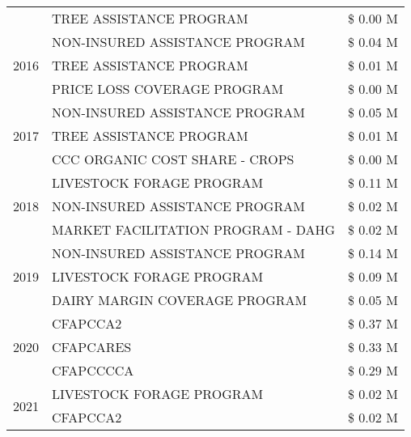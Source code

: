 \begin{tabular}{llr}
 & TREE ASSISTANCE PROGRAM & \$ 0.00 M \\
\cline{1-3}
\multirow[t]{3}{*}{2016} & NON-INSURED ASSISTANCE PROGRAM                & \$ 0.04 M \\
 & TREE ASSISTANCE PROGRAM                       & \$ 0.01 M \\
 & PRICE LOSS COVERAGE PROGRAM                   & \$ 0.00 M \\
\cline{1-3}
\multirow[t]{3}{*}{2017} & NON-INSURED ASSISTANCE PROGRAM & \$ 0.05 M \\
 & TREE ASSISTANCE PROGRAM & \$ 0.01 M \\
 & CCC ORGANIC COST SHARE - CROPS & \$ 0.00 M \\
\cline{1-3}
\multirow[t]{3}{*}{2018} & LIVESTOCK FORAGE PROGRAM & \$ 0.11 M \\
 & NON-INSURED ASSISTANCE PROGRAM & \$ 0.02 M \\
 & MARKET FACILITATION PROGRAM - DAHG & \$ 0.02 M \\
\cline{1-3}
\multirow[t]{3}{*}{2019} & NON-INSURED ASSISTANCE PROGRAM & \$ 0.14 M \\
 & LIVESTOCK FORAGE PROGRAM & \$ 0.09 M \\
 & DAIRY MARGIN COVERAGE PROGRAM & \$ 0.05 M \\
\cline{1-3}
\multirow[t]{3}{*}{2020} & CFAPCCA2 & \$ 0.37 M \\
 & CFAPCARES & \$ 0.33 M \\
 & CFAPCCCCA & \$ 0.29 M \\
\cline{1-3}
\multirow[t]{2}{*}{2021} & LIVESTOCK FORAGE PROGRAM & \$ 0.02 M \\
 & CFAPCCA2 & \$ 0.02 M \\
\cline{1-3}
\bottomrule
\end{tabular}
